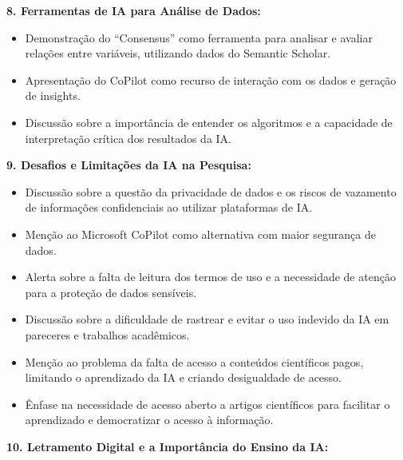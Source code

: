 \documentclass[
  a4paper,
]{book}
\providecommand{\tightlist}{%
  \setlength{\itemsep}{0pt}\setlength{\parskip}{0pt}}\usepackage{longtable,booktabs,array}
\begin{document}
\begin{tcolorbox}
\textbf{8. Ferramentas de IA para Análise de Dados:}\vspace{0.5em}

\begin{itemize}
\tightlist
\item
  Demonstração do ``Consensus'' como ferramenta para analisar e avaliar
  relações entre variáveis, utilizando dados do Semantic Scholar.
\item
  Apresentação do CoPilot como recurso de interação com os dados e
  geração de insights.
\item
  Discussão sobre a importância de entender os algoritmos e a capacidade
  de interpretação crítica dos resultados da IA.\vspace{0.5em}
\end{itemize}

\textbf{9. Desafios e Limitações da IA na Pesquisa:}\vspace{0.5em}

\begin{itemize}
\tightlist
\item
  Discussão sobre a questão da privacidade de dados e os riscos de
  vazamento de informações confidenciais ao utilizar plataformas de IA.
\item
  Menção ao Microsoft CoPilot como alternativa com maior segurança de
  dados.
\item
  Alerta sobre a falta de leitura dos termos de uso e a necessidade de
  atenção para a proteção de dados sensíveis.
\item
  Discussão sobre a dificuldade de rastrear e evitar o uso indevido da
  IA em pareceres e trabalhos acadêmicos.
\item
  Menção ao problema da falta de acesso a conteúdos científicos pagos,
  limitando o aprendizado da IA e criando desigualdade de acesso.
\item
  Ênfase na necessidade de acesso aberto a artigos científicos para
  facilitar o aprendizado e democratizar o acesso à
  informação.\vspace{0.5em}
\end{itemize}

\textbf{10. Letramento Digital e a Importância do Ensino da
IA:}\vspace{0.5em}


\end{tcolorbox}
\end{document}
